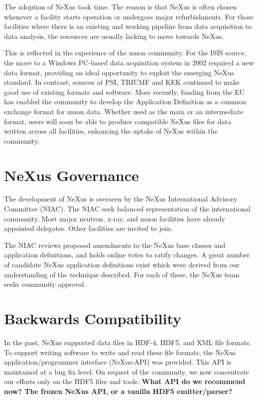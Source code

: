\documentclass[%
 aip,
rsi,
 amsmath,amssymb,
 reprint,%
]{revtex4-1}
\begin{document}
The adoption of NeXus took time. The reason is that NeXus is often chosen whenever 
a facility starts operation or undergoes major refurbishments. For those facilities where there is an existing and working 
pipeline from data acquisition to data analysis,  the resources are usually lacking to move 
towards NeXus.

This is reflected in the experience of the muon community. For the ISIS source, the move to a Windows PC-based data acquisition 
system in 2002 required a new data format, providing an ideal opportunity to exploit the emerging NeXus standard\cite{muon1}. In 
contrast, sources at PSI, TRIUMF and KEK continued to make good use of existing formats and software. More recently, funding 
from the EU has enabled the community to develop the Application Definition as a common exchange format for muon data\cite{muon2}. 
Whether used as the main or an intermediate format, users will soon be able to produce compatible NeXus files for data written 
across all facilities, enhancing the uptake of NeXus within the community.


\section{NeXus Governance}
  \label{sect_gov}

The development of NeXus is overseen
by the NeXus International Advisory Committee (NIAC).
The NIAC seek balanced representation of the international community.
Most major neutron, x-ray, and muon facilities have already appointed delegates.
Other facilities are invited to join.

The NIAC reviews proposed amendments to the NeXus base classes and
application definitions, and holds online votes to ratify changes.
A great number of candidate NeXus application definitions exist which were derived from our understanding of the technique described.
For each of these, the NeXus team seeks community approval. 


\section{Backwards Compatibility}

In the past, NeXus supported data files in HDF-4, HDF5, and XML file formats. 
To support writing software to write and read these file formats, the NeXus
application/programmer interface (NeXus-API) was provided.
This API is maintained at a bug fix level.
On request of the community, we now concentrate our efforts only
on the HDF5 files and tools.
\textbf{What API do we recommend now? The frozen NeXus API, or a vanilla HDF5 emitter/parser?}
\end{document}

